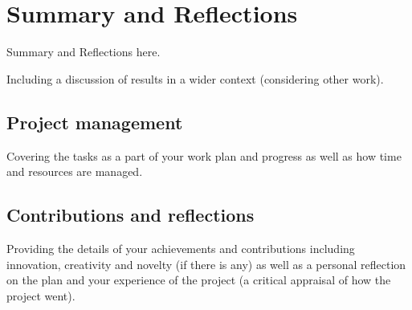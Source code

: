 \chapter{Summary and Reflections}

\label{ch:summary}

Summary and Reflections here.

Including a discussion of results in a wider context (considering other work).



\section{Project management}

Covering the tasks as a part of your work plan and progress as well as how time and resources are managed.


\section{Contributions and reflections}

Providing the details of your achievements and contributions including innovation, creativity and novelty (if there is any) as well as a personal reflection on the plan and your experience of the project (a critical appraisal of how the project went).
